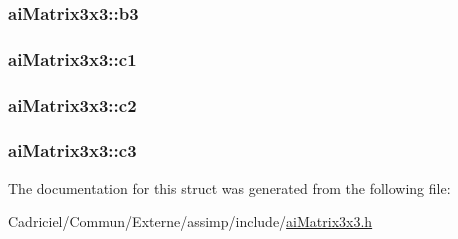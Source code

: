 \hypertarget{structai_matrix3x3_a21aa4345fe6ce2774db94d118c536d02}{
\subsubsection[{b3}]{ ai\-Matrix3x3\-::b3}}\label{structai_matrix3x3_a21aa4345fe6ce2774db94d118c536d02}
\hypertarget{structai_matrix3x3_ae62a2877076cbee151e89cb34567e3ca}{
\subsubsection[{c1}]{ ai\-Matrix3x3\-::c1}}\label{structai_matrix3x3_ae62a2877076cbee151e89cb34567e3ca}
\hypertarget{structai_matrix3x3_a8e0d85d5c46eb4f4478f1fe159be4320}{
\subsubsection[{c2}]{ ai\-Matrix3x3\-::c2}}\label{structai_matrix3x3_a8e0d85d5c46eb4f4478f1fe159be4320}
\hypertarget{structai_matrix3x3_aa7eef894dec22db1011092410b24f19b}{
\subsubsection[{c3}]{ ai\-Matrix3x3\-::c3}}\label{structai_matrix3x3_aa7eef894dec22db1011092410b24f19b}


The documentation for this struct was generated from the following file\-:\begin{DoxyCompactItemize}
\item 
Cadriciel/\-Commun/\-Externe/assimp/include/\hyperlink{ai_matrix3x3_8h}{ai\-Matrix3x3.\-h}\end{DoxyCompactItemize}

